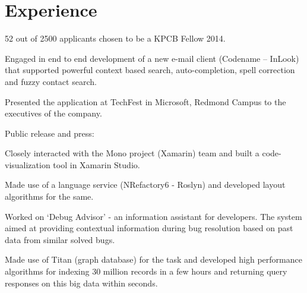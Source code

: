 \documentclass[]{deedy-resume-openfont}
\begin{document}
\begin{minipage}[t]{0.69\textwidth} 


\section{Experience}

\vspace{\topsep} %
\begin{tightemize}
\item 52 out of 2500 applicants chosen to be a KPCB Fellow 2014.
\end{tightemize}
\sectionsep

\begin{tightemize}
\item Engaged in end to end development of a new e-mail client (Codename – InLook) that supported powerful context based search, auto-completion, spell correction and fuzzy contact search. 
\item Presented the application at TechFest in Microsoft, Redmond Campus to the executives of the company.
\item Public release and press: 
\end{tightemize}
\sectionsep

\begin{tightemize}
\item Closely interacted with the Mono project (Xamarin) team and built a code-visualization tool in Xamarin Studio.
\item Made use of a language service (NRefactory6 - Roslyn) and developed layout algorithms for the same.
\end{tightemize}
\sectionsep

\begin{tightemize}
\item Worked on ‘Debug Advisor’ - an information assistant for developers. The system aimed at providing contextual information during bug resolution based on past data from similar solved bugs. 
\item Made use of Titan (graph database) for the task and developed high performance algorithms for indexing 30 million records in a few hours and returning query responses on this big data within seconds.
\end{tightemize}
\sectionsep


\end{minipage}
\end{document}
